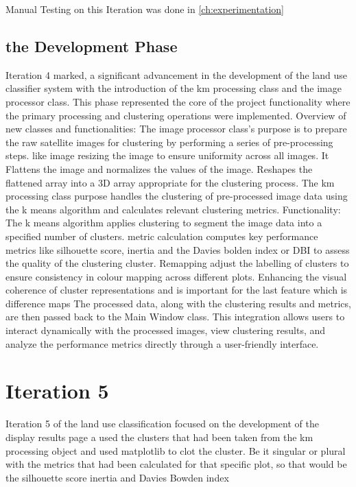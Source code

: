 Manual Testing on this Iteration was done in \ref{ch:experimentation}

\subsection{the Development Phase}\label{subsec:development-phase3}

Iteration 4 marked, a significant advancement in the development of the land use classifier system with the introduction of the km processing class and the image processor class.
This phase represented the core of the project functionality where the primary processing and clustering operations were implemented.
Overview of new classes and functionalities:
The image processor class's purpose is to prepare the raw satellite images for clustering by performing a series of pre-processing steps.
like image resizing the image to ensure uniformity across all images.
It Flattens the image and normalizes the values of the image.
Reshapes the flattened array into a 3D array appropriate for the clustering process.
The km processing class purpose handles the clustering of pre-processed image data using the k means algorithm and calculates relevant clustering metrics.
Functionality: The k means algorithm applies clustering to segment the image data into a specified number of clusters.
metric calculation computes key performance metrics like silhouette score, inertia and the Davies bolden index or DBI to assess the quality of the clustering cluster.
Remapping adjust the labelling of clusters to ensure consistency in colour mapping across different plots.
Enhancing the visual coherence of cluster representations and is important for the last feature which is difference maps
The processed data, along with the clustering results and metrics, are then passed back to the Main Window class.
This integration allows users to interact dynamically with the processed images, view clustering results,
and analyze the performance metrics directly through a user-friendly interface.




\section{Iteration 5}\label{sec:iteration-5}

Iteration 5 of the land use classification focused on the development of the display results page a used the clusters
that had been taken from the km processing object and used matplotlib to clot the cluster.
Be it singular or plural with the metrics that had been calculated for that specific plot,
so that would be the silhouette score inertia and Davies Bowden index



